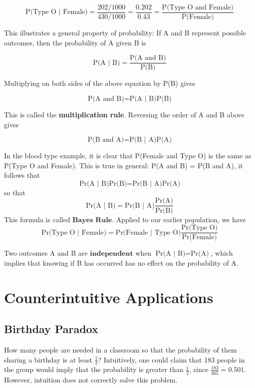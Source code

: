 \documentclass[
]{book}
\begin{document}
\[
\mbox{P(Type O | Female)} = \frac{202/1000}{430/1000} 
= \frac{0.202}{0.43} = \frac{\mbox{P(Type O and Female)}}{\mbox{P(Female)}}
\]

This illustrates a general property of probability: If A and B represent possible outcomes, then the probability of A given B is

\[
\mbox{P(A | B)} = \frac{\mbox{P(A and B)}}{\mbox{P(B)}}
\]

Multiplying on both sides of the above equation by P(B) gives

\[
\mbox{P(A and B)} = \mbox{P(A | B)}\mbox{P(B)}  
\]

This is called the \textbf{multiplication rule}. Reversing the order of A and B above gives

\[
\mbox{P(B and A)} = \mbox{P(B | A)}\mbox{P(A)}  
\]

In the blood type example, it is clear that P(Female and Type O) is the same as P(Type O and Female).
This is true in general: P(A and B) = P(B and A), it follows that
\[
\mbox{Pr(A | B)}\mbox{Pr(B)}  = \mbox{Pr(B | A)}\mbox{Pr(A)} 
\]
so that
\[
\mbox{Pr(A | B)}  = \mbox{Pr(B | A)}\frac{\mbox{Pr(A)}}{\mbox{Pr(B)}}
\]
This formula is called \(\textbf{Bayes Rule}\). Applied to our earlier population, we have
\[
\mbox{Pr(Type O | Female)} = \mbox{Pr(Female | Type O)}\frac{\mbox{Pr(Type O)}}{\mbox{Pr(Female)}}
\]

Two outcomes A and B are \(\textbf{independent}\) when \(\mbox{Pr(A | B)} = \mbox{Pr(A)}\),
which implies that knowing if B has occurred has no effect on the probability of A.

\hypertarget{counterintuitive-applications}{%
\chapter{Counterintuitive Applications}\label{counterintuitive-applications}}

\hypertarget{birthday-paradox}{%
\section{Birthday Paradox}\label{birthday-paradox}}

How many people are needed in a classroom so that the probability of them sharing a birthday is at least \(\frac{1}{2}\)?
Intuitively, one could claim that 183 people in the group would imply that the probability is greater than \(\frac{1}{2}\),
since \(\frac{183}{365} = 0.501\). However, intuition does not correctly solve this problem.
\end{document}
